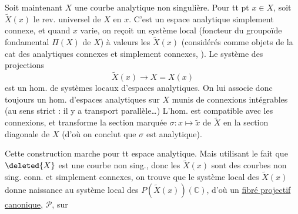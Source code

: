 Soit maintenant $X$ une courbe analytique non singulière. Pour tt pt $x\in X$, soit $\widetilde X(x)$ le rev. universel de $X$ en $x$. C'est un espace analytique simplement connexe, et quand $x$ varie, on reçoit un système local (foncteur du groupoïde fondamental $\Pi(X)$ de $X$) à valeurs les $\widetilde X(x)$ (considérés comme objets de la cat des  analytiques connexes et simplement connexes, ). Le système des projections
\[\widetilde X(x)\longrightarrow X=X(x)\]
est un hom. de systèmes locaux d'espaces analytiques. On lui associe donc toujours un hom. d'espaces analytiques sur $X$
munis de connexions intégrables (au sens strict : il y a transport parallèle\ldots)
L'hom. est compatible avec les connexions, et transforme la section marquée $\sigma:x\mapsto\widetilde x$ de $\widetilde X$ en la section diagonale de $X$ (d'où on conclut que $\sigma$ est analytique).

Cette construction marche pour tt espace analytique. Mais utilisant le fait que $\deleted{X}$ est une courbe non sing., donc les $\widetilde X(x)$ sont des courbes non sing. conn. et simplement connexes, on trouve que le système local des $\widetilde X(x)$ donne naissance au système local des $P(\widetilde X(x))(\mathbb C)$, d'où un \uline{fibré projectif canonique}, $\mathcal P$, sur
